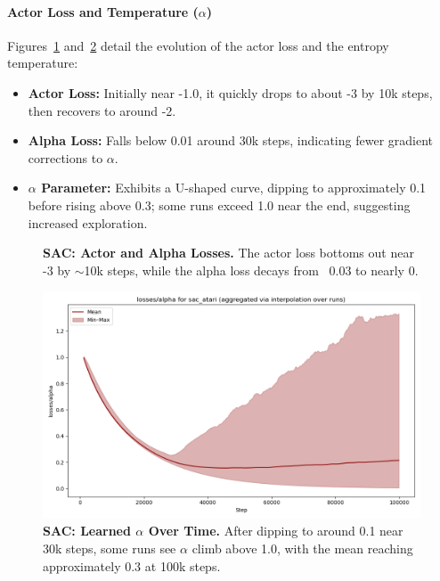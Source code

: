 \paragraph{Actor Loss and Temperature (\(\alpha\))}
Figures~\ref{fig:sac_actor_alpha_losses} and~\ref{fig:sac_alpha} detail the evolution of the actor loss and the entropy temperature:
\begin{itemize}
	\item \textbf{Actor Loss:} Initially near -1.0, it quickly drops to about -3 by 10k steps, then recovers to around -2.
	\item \textbf{Alpha Loss:} Falls below 0.01 around 30k steps, indicating fewer gradient corrections to \(\alpha\).
	\item \textbf{\(\alpha\) Parameter:} Exhibits a U-shaped curve, dipping to approximately 0.1 before rising above 0.3; some runs exceed 1.0 near the end, suggesting increased exploration.
\end{itemize}

\begin{figure}
	\centering
	\quad
	\caption{\textbf{SAC: Actor and Alpha Losses.} The actor loss bottoms out near -3 by \(\sim\)10k steps, while the alpha loss decays from ~0.03 to nearly 0.}
	\label{fig:sac_actor_alpha_losses}
\end{figure}

\begin{figure}
	\centering
	\includegraphics[width=.5\textwidth]{figures/sac/losses_alpha_sac_atari.png}
	\caption{\textbf{SAC: Learned \(\alpha\) Over Time.} After dipping to around 0.1 near 30k steps, some runs see \(\alpha\) climb above 1.0, with the mean reaching approximately 0.3 at 100k steps.}
	\label{fig:sac_alpha}
\end{figure}


